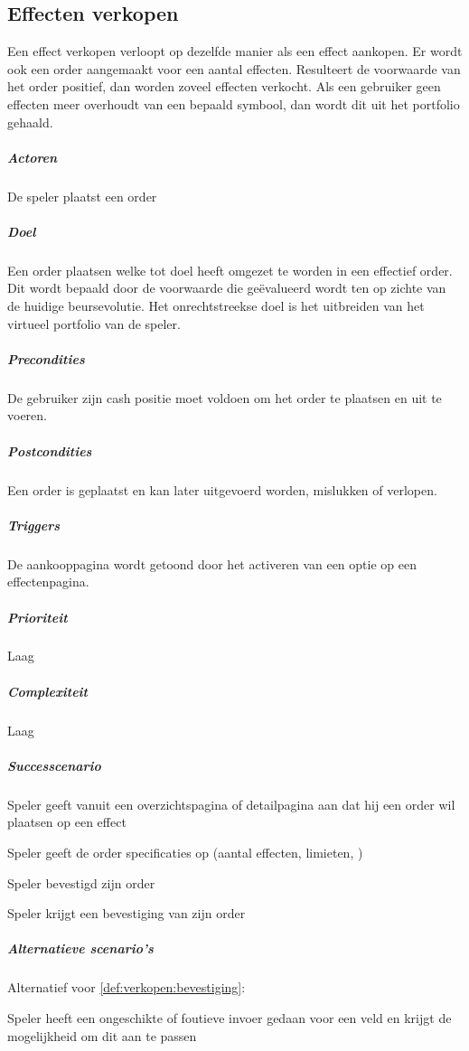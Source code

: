 \subsection{Effecten verkopen}
\begin{compact}
Een effect verkopen verloopt op dezelfde manier als een effect aankopen. Er wordt ook een order aangemaakt voor een aantal effecten. Resulteert de voorwaarde van het order positief, dan worden zoveel effecten verkocht. Als een gebruiker geen effecten meer overhoudt van een bepaald symbool, dan wordt dit uit het portfolio gehaald.
\subparagraph{Actoren} De speler plaatst een order
\subparagraph{Doel} Een order plaatsen welke tot doel heeft omgezet te worden in een effectief order. Dit wordt bepaald door de voorwaarde die ge\"evalueerd wordt ten op zichte van de huidige beursevolutie. Het onrechtstreekse doel is het uitbreiden van het virtueel portfolio van de speler.
\subparagraph{Precondities} De gebruiker zijn cash positie moet voldoen om het order te plaatsen en uit te voeren.
\subparagraph{Postcondities} Een order is geplaatst en kan later uitgevoerd worden, mislukken of verlopen.
\subparagraph{Triggers} De aankooppagina wordt getoond door het activeren van een optie op een effectenpagina.
\subparagraph{Prioriteit}Laag
\subparagraph{Complexiteit}Laag
\subparagraph{Successcenario}
\begin{enumerate_compact}
 \item Speler geeft vanuit een overzichtspagina of detailpagina aan dat hij een order wil plaatsen op een effect
 \item Speler geeft de order specificaties op (aantal effecten, limieten, )
 \item Speler bevestigd zijn order
 \item \label{def:verkopen:bevestiging} Speler krijgt een bevestiging van zijn order
\end{enumerate_compact}
\subparagraph{Alternatieve scenario's}
Alternatief voor \ref{def:verkopen:bevestiging}:
\begin{enumerate_compact}
 \item Speler heeft een ongeschikte of foutieve invoer gedaan voor een veld en krijgt de mogelijkheid om dit aan te passen
\end{enumerate_compact}
\end{compact}

